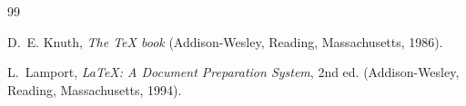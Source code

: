 \documentclass[aps,prd,preprint,floats,epsf,superscriptaddress,nofootinbib]{revtex4}
\begin{document}


\begin{thebibliography}{99}


D.~E. Knuth,
\textit{The \TeX{} book}
(Addison-Wesley, Reading, Massachusetts, 1986).

L.~Lamport,
\textit{\LaTeX: A Document Preparation System}, 2nd ed.
(Addison-Wesley, Reading, Massachusetts, 1994).



\end{thebibliography}
\end{document}
